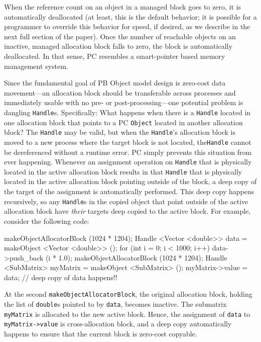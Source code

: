 When the reference count on an object in a managed block goes to zero, it is automatically
deallocated (at least, this is the default behavior; it is possible for a programmer to override this behavior for speed, if desired, as we describe in the
next full section of the paper).  
Once the number of reachable objects on an inactive, managed allocation block falls to zero, the block is automatically deallocated.  
In that sense, PC resembles a smart-pointer based memory management system.  

Since the fundamental goal of PB Object model design is 
zero-cost data movement---an allocation block should be transferable across processes and immediately usable with no pre- or post-processing---one
potential problem is dangling \texttt{Handle}s.  Specifically: What happens when there is a \texttt{Handle} located in one allocation block that points to a PC
\texttt{Object} located in another allocation block?  The \texttt{Handle} may be valid, but when the \texttt{Handle}'s allocation block is moved to a new process where
the target block is not located, the\texttt{Handle} cannot be dereferenced without a runtime error. 
PC simply prevents this situation from ever happening. Whenever an assignment operation on \texttt{Handle} that is physically located
in the active allocation block results in that
\texttt{Handle} that is physically located in the active allocation block pointing outside of the block, a deep copy of the target of the assignment
is automatically performed.  This deep copy happens recursively, so any \texttt{Handle}s in the copied object that point outside of the active allocation block
have \emph{their} targets deep copied to the active block.  For example, consider the following code:

\begin{code}
makeObjectAllocatorBlock (1024 * 1204);
Handle <Vector <double>> data = makeObject <Vector <double>> ();
for (int i = 0; i < 1000; i++)
     data->push_back (i * 1.0);
makeObjectAllocatorBlock (1024 * 1204); 
Handle <SubMatrix> myMatrix = makeObject <SubMatrix> ();
myMatrix->value = data; // deep copy of data happens!!
\end{code}

At the second \texttt{makeObjectAllocatorBlock}, the original allocation block, holding the list of \texttt{double}s pointed to by \texttt{data}, becomes
inactive.  The submatrix \texttt{myMatrix} is allocated to the new active block.  
Hence, the assignment of \texttt{data} to \texttt{myMatrix->value} is cross-allocation block, and a deep copy automatically happens to ensure that
the current block is zero-cost copyable.  

